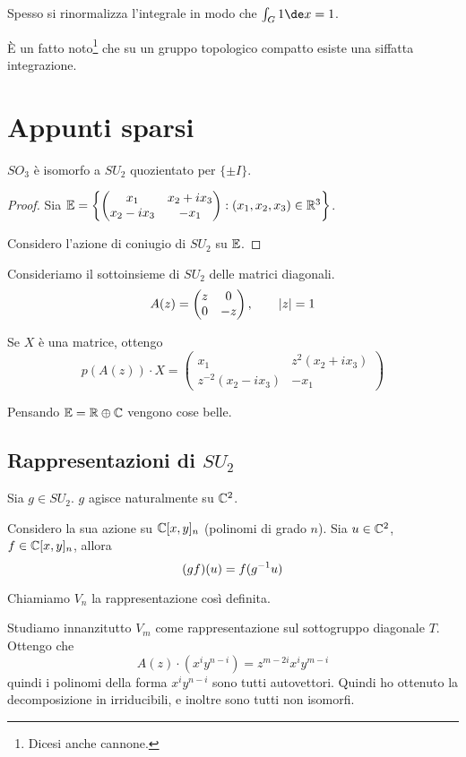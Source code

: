 	Spesso si rinormalizza l'integrale in modo che $\haar 1=1$.
	
	\`E un fatto noto\footnote{Dicesi anche cannone.} che su un gruppo topologico compatto esiste una siffatta integrazione.



\section{Appunti sparsi}


\begin{myprop}
 $SO_3$ è isomorfo a $SU_2$ quozientato per $\{\pm I\}$.
\end{myprop}
\begin{proof}
	Sia $\mathbb E=\left\{\left(
		\begin{matrix}
			x_1	& x_2+ix_3 \\
			x_2-ix_3 & -x_1 
		\end{matrix}
	\right): (x_1,x_2,x_3) \in \mathbb R^3\right\}$.

	Considero l'azione di coniugio di $SU_2$ su $\mathbb E$. 
\end{proof}

Consideriamo il sottoinsieme di $SU_2$ delle matrici diagonali.
\[
	A(z) = \left(
		\begin{matrix}
		z & 0 \\
		0 & -z
		\end{matrix}
	\right), \qquad \left|z\right|=1
\]

Se $X$ è una matrice, ottengo
\[
	p(A(z))\cdot X = \left( 
	\begin{matrix}
		x_1 & z^2(x_2+ix_3) \\
		z^{-2}(x_2-ix_3) & -x_1
	\end{matrix}
	\right)
\]

Pensando $\mathbb E = \mathbb R \oplus \mathbb C$ vengono cose belle.

\subsection{Rappresentazioni di $SU_2$}
	Sia $g \in SU_2$. $g$ agisce naturalmente su $\mathbb C^2$.
	
	Considero la sua azione su $\mathbb C[x,y]_n$ (polinomi di grado $n$). Sia $u \in \mathbb C^2$, $f \in \mathbb C[x,y]_n$, allora 
	\[
	 (gf)(u) = f(g^{-1} u)
	\]
	
	Chiamiamo $V_n$ la rappresentazione così definita.

	Studiamo innanzitutto $V_m$ come rappresentazione sul sottogruppo diagonale $T$.
	Ottengo che 
	\[
		A(z) \cdot (x^i y^{n-i}) = z^{m-2i}x^iy^{m-i}
	\]
	quindi i polinomi della forma $x^iy^{n-i}$ sono tutti autovettori. Quindi ho ottenuto la decomposizione in irriducibili, e inoltre sono tutti non isomorfi.
	

